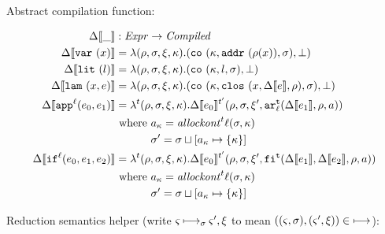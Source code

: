 \documentclass{llncs}
\begin{document}
Abstract compilation function:

\begin{align*}
\dcompile{\_} &: \Expr \to \Compiled \\
\dcompile{\svar\mvar} &= \lambda(\menv,\msto,\msdiff, \mkont) .
                          \ttuple{\co{\mkont, \spchoice{\saddr{\menv(\mvar)}}{\superposition{\msto(\menv(\mvar))}},\msto}}{\bot}
\\
\dcompile{\slit\mlit} &= \lambda(\menv,\msto,\msdiff,\mkont) .
\ttuple{\co{\mkont,\mlit,\msto}}{\bot}
\\
\dcompile{\slam\mvar\mexp} &= \lambda(\menv,\msto,\msdiff,\mkont) .
\ttuple{\co{\mkont,\clos{\mvar,\dcompile\mexp,\menv},\msto}}{\bot}
\\
\dcompile{\sapp[^\mlab]{\mexpi0}{\mexpi1}} &= \lambda^\mcntr (\menv,\msto,\msdiff,\mkont) .
\dcompile{\mexpi0}^{\mcntr'}(\menv,\msto,\msdiff',\kar[_\mlab^\mcntr]{\dcompile{\mexpi1},\menv,\maddr})
\\
&\text{ where }\maddr_\mkont = \allockont^\mcntr\mlab(\msto,\mkont) \\
&\phantom{\text{ where }}\msto' = \msto\sqcup[\maddr_\mkont \mapsto \setof{\mkont}]
\\
\dcompile{\sif[^\mlab]{\mexpi0}{\mexpi1}{\mexpi2}} &= \lambda^\mcntr(\menv,\msto,\msdiff,\mkont) .
\dcompile{\mexpi0}^{\mcntr'}(\menv,\msto,\msdiff',\kif[^\mcntr]{\dcompile{\mexpi1},\dcompile{\mexpi2},\menv,\maddr})
\\
&\text{ where }\maddr_\mkont = \allockont^\mcntr\mlab(\msto,\mkont) \\
&\phantom{\text{ where }}\msto' = \msto\sqcup[\maddr_\mkont \mapsto \setof{\mkont}]
\end{align*}

Reduction semantics helper (write $\varsigma \mathbin{\longmapsto}_\sigma \varsigma',\xi$ to mean $((\varsigma,\sigma),(\varsigma',\xi)) \in \mathbin{\longmapsto}$):
\end{document}
